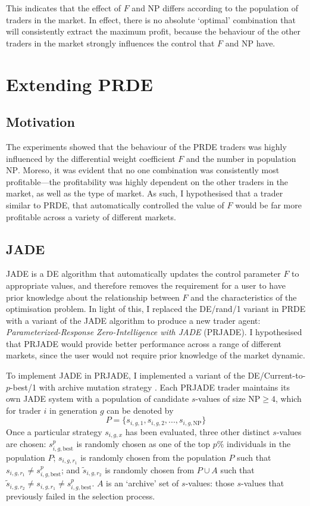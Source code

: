 \documentclass[conference]{IEEEtran}
\begin{document}
This indicates that the effect of $F$ and $\mathrm{NP}$ differs according to the population of traders in the market.
In effect, there is no absolute `optimal' combination that will consistently extract the maximum profit, because the behaviour of the other traders in the market strongly influences the control that $F$ and $\mathrm{NP}$ have.

\section{Extending PRDE}

\subsection{Motivation}

The experiments showed that the behaviour of the PRDE traders was highly influenced by the differential weight coefficient $F$ and the number in population $\mathrm{NP}$.
Moreso, it was evident that no one combination was consistently most profitable---the profitability was highly dependent on the other traders in the market, as well as the type of market.
As such, I hypothesised that a trader similar to PRDE, that automatically controlled the value of $F$ would be far more profitable across a variety of different markets.

\subsection{JADE}

JADE \cite{ZhangSanderson} is a DE algorithm that automatically updates the control parameter $F$ to appropriate values, and therefore removes the requirement for a user to have prior knowledge about the relationship between $F$ and the characteristics of the optimisation problem.
In light of this, I replaced the DE/rand/1 variant in PRDE with a variant of the JADE algorithm to produce a new trader agent: \textit{Parameterized-Response Zero-Intelligence with JADE} (PRJADE).
I hypothesised that PRJADE would provide better performance across a range of different markets, since the user would not require prior knowledge of the market dynamic.

To implement JADE in PRJADE, I implemented a variant of the DE/Current-to-$p$-best/1 with archive mutation strategy \cite{ZhangSanderson}.
Each PRJADE trader maintains its own JADE system with a population of candidate $s$-values of size $\mathrm{NP}\ge 4$, which for trader $i$ in generation $g$ can be denoted by 
\[
    P=\{s_{i,g,1}, s_{i,g,2},...,s_{i,g,\mathrm{NP}}\}
\]
Once a particular strategy $s_{i,g,x}$ has been evaluated, three other distinct $s$-values are chosen: $s^p_{i,g,\text{best}}$ is randomly chosen as one of the top $p\%$ individuals in the population $P$; $s_{i,g,r_1}$ is randomly chosen from the population $P$ such that $s_{i,g,r_1}\ne s^p_{i,g,\text{best}}$; and $\tilde{s}_{i,g,r_2}$ is randomly chosen from $P\cup A$ such that $\tilde{s}_{i,g,r_2}\ne s_{i,g,r_1}\ne s^p_{i,g,\text{best}}$.
$A$ is an `archive' set of $s$-values: those $s$-values that previously failed in the selection process.
\end{document}
